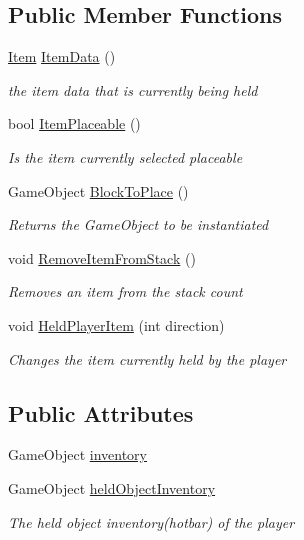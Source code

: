 \subsection*{Public Member Functions}
\begin{DoxyCompactItemize}
\item 
\hyperlink{struct_bee_game_1_1_items_1_1_item}{Item} \hyperlink{class_bee_game_1_1_inventory_1_1_player_inventory_a52e75cc8105c299708ac8ccad0d01828}{Item\+Data} ()
\begin{DoxyCompactList}\small\item\em the item data that is currently being held \end{DoxyCompactList}\item 
bool \hyperlink{class_bee_game_1_1_inventory_1_1_player_inventory_a5745fc23291d5916c116500b384bc66e}{Item\+Placeable} ()
\begin{DoxyCompactList}\small\item\em Is the item currently selected placeable \end{DoxyCompactList}\item 
Game\+Object \hyperlink{class_bee_game_1_1_inventory_1_1_player_inventory_a30f01639eaee55b92c8feb4a5ab2e5df}{Block\+To\+Place} ()
\begin{DoxyCompactList}\small\item\em Returns the Game\+Object to be instantiated \end{DoxyCompactList}\item 
void \hyperlink{class_bee_game_1_1_inventory_1_1_player_inventory_ae50a91db412070ff4e43b93c70a4e28d}{Remove\+Item\+From\+Stack} ()
\begin{DoxyCompactList}\small\item\em Removes an item from the stack count \end{DoxyCompactList}\item 
void \hyperlink{class_bee_game_1_1_inventory_1_1_player_inventory_a370bc5a57950cdb31f834af4523a8436}{Held\+Player\+Item} (int direction)
\begin{DoxyCompactList}\small\item\em Changes the item currently held by the player \end{DoxyCompactList}\end{DoxyCompactItemize}
\subsection*{Public Attributes}
\begin{DoxyCompactItemize}
\item 
Game\+Object \hyperlink{class_bee_game_1_1_inventory_1_1_player_inventory_a102e6767793ea61ae62dce5840fd405b}{inventory}
\item 
Game\+Object \hyperlink{class_bee_game_1_1_inventory_1_1_player_inventory_a595e1144315e0e9be0b825b538643e1f}{held\+Object\+Inventory}
\begin{DoxyCompactList}\small\item\em The held object inventory(hotbar) of the player \end{DoxyCompactList}\end{DoxyCompactItemize}
